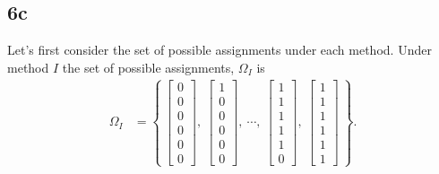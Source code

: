 \documentclass[
  12pt,
  leqno]{article}
\DeclareMathOperator{\1}{\mathbbm{1}}
\begin{document}
\subsection*{6c}

Let's first consider the set of possible assignments under each method.
Under method \(I\) the set of possible assignments, \(\Omega_I\) is
\begin{align*}
\Omega_{I} & = \left\{ \ \begin{bmatrix} 0 \\ 0 \\ 0 \\ 0 \\ 0 \\ 0 \end{bmatrix}, \  \begin{bmatrix} 1 \\ 0 \\ 0 \\ 0 \\ 0 \\ 0 \end{bmatrix}, \ \cdots , \ \begin{bmatrix} 1 \\ 1 \\ 1 \\ 1 \\ 1 \\ 0  \end{bmatrix}, \ \begin{bmatrix} 1 \\ 1 \\ 1 \\ 1 \\ 1 \\ 1  \end{bmatrix} \ \right\}.
\end{align*}
\end{document}
